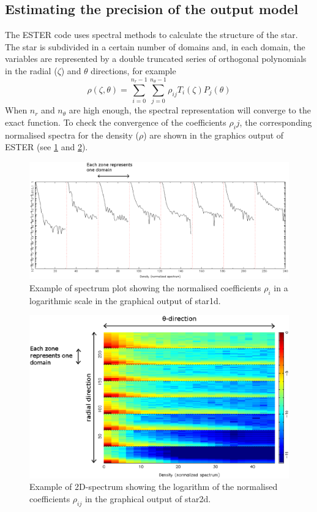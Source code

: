 \subsection{Estimating the precision of the output model}

The ESTER code uses spectral methods to calculate the structure of the star. 
The star is subdivided in a certain number of domains and, in each domain, the variables
are represented by a double truncated series of orthogonal polynomials in the radial ($\zeta$)
 and $\theta$ directions, for example
$$\rho(\zeta,\theta)=\sum_{i=0}^{n_r-1}\sum_{j=0}^{n_\theta-1}\rho_{ij}T_i(\zeta)P_j(\theta)$$
When $n_r$ and $n_\theta$ are high enough, the spectral representation will converge to the
exact function. 
To check the convergence of the coefficients $\rho_ij$, the corresponding normalised spectra
for the density ($\rho$) 
are shown in the graphics output of ESTER (see \ref{fig:spectrum1d} and \ref{fig:spectrum2d}).
\begin{figure}[H]
\includegraphics[width=\textwidth]{fig/spectrum1d.eps}
\caption{Example of spectrum plot showing the normalised coefficients $\rho_{i}$ in a logarithmic scale
 in the graphical output of star1d.
\label{fig:spectrum1d}}
\end{figure} 
\begin{figure}[H]
\includegraphics[width=\textwidth]{fig/spectrum2d.eps}
\caption{Example of 2D-spectrum showing the logarithm of the normalised coefficients $\rho_{ij}$ 
in the graphical output of star2d.
\label{fig:spectrum2d}}
\end{figure}

